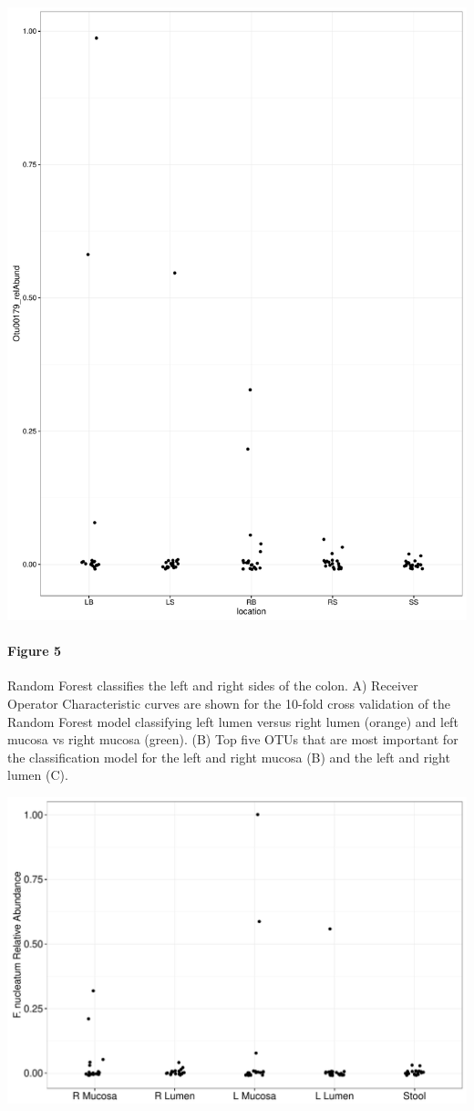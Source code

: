\documentclass[11pt,]{article}
\let\oldparagraph\paragraph
\renewcommand{\paragraph}[1]{\oldparagraph{#1}\mbox{}}
\begin{document}
\includegraphics{submission/figure_5.pdf}

\paragraph{Figure 5}\label{figure-5}

Random Forest classifies the left and right sides of the colon. A)
Receiver Operator Characteristic curves are shown for the 10-fold cross
validation of the Random Forest model classifying left lumen versus
right lumen (orange) and left mucosa vs right mucosa (green). (B) Top
five OTUs that are most important for the classification model for the
left and right mucosa (B) and the left and right lumen (C).

\newpage

\includegraphics{submission/figure_6.pdf}
\end{document}
